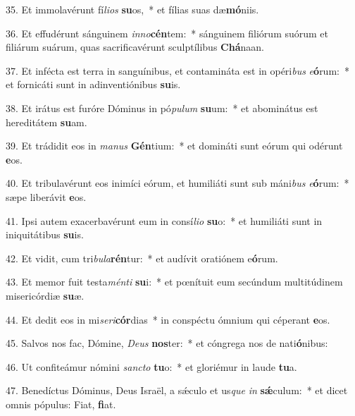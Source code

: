 35. Et immolavérunt fí\textit{li}\textit{os} \textbf{su}os,~*  et fílias suas dæ\textbf{mó}niis.\

36. Et effudérunt sánguinem \textit{in}\textit{no}\textbf{cén}tem:~*  sánguinem filiórum suórum et filiárum suárum, quas sacrificavérunt sculptílibus \textbf{Chá}naan.\

37. Et infécta est terra in sanguínibus, et contamináta est in opéri\textit{bus} \textit{e}\textbf{ó}rum:~*  et fornicáti sunt in adinventiónibus \textbf{su}is.\

38. Et irátus est furóre Dóminus in pó\textit{pu}\textit{lum} \textbf{su}um:~*  et abominátus est hereditátem \textbf{su}am.\

39. Et trádidit eos in \textit{ma}\textit{nus} \textbf{Gén}tium:~*  et domináti sunt eórum qui odérunt \textbf{e}os.\

40. Et tribulavérunt eos inimíci eórum, et humiliáti sunt sub máni\textit{bus} \textit{e}\textbf{ó}rum:~*  sæpe liberávit \textbf{e}os.\

41. Ipsi autem exacerbavérunt eum in consí\textit{li}\textit{o} \textbf{su}o:~*  et humiliáti sunt in iniquitátibus \textbf{su}is.\

42. Et vidit, cum tri\textit{bu}\textit{la}\textbf{rén}tur:~*  et audívit oratiónem e\textbf{ó}rum.\

43. Et memor fuit testa\textit{mén}\textit{ti} \textbf{su}i:~*  et pœnítuit eum secúndum multitúdinem misericórdiæ \textbf{su}æ.\

44. Et dedit eos in mi\textit{se}\textit{ri}\textbf{cór}dias~*  in conspéctu ómnium qui céperant \textbf{e}os.\

45. Salvos nos fac, Dómine, \textit{De}\textit{us} \textbf{nos}ter:~*  et cóngrega nos de nati\textbf{ó}nibus:\

46. Ut confiteámur nómini \textit{sanc}\textit{to} \textbf{tu}o:~*  et gloriémur in laude \textbf{tu}a.\

47. Benedíctus Dóminus, Deus Israël, a sǽculo et us\textit{que} \textit{in} \textbf{sǽ}culum:~*  et dicet omnis pópulus: Fiat, \textbf{fi}at.\

